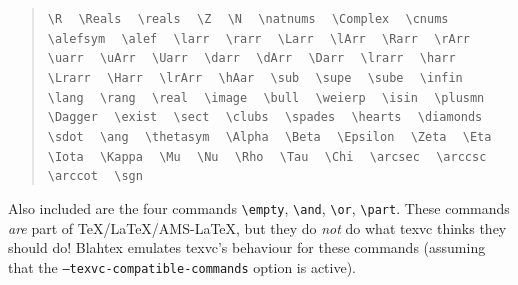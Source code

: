 \documentclass{article}
\newcommand{\texcommand}[1]{\textbackslash{}#1}
\newcommand{\spacer}{\,\,\, \hfil}
\newcommand{\lastspacer}{\hfill\hfill\hfill}
\newenvironment{mylist}{\begin{quote}}{\end{quote}}
\begin{document}
\begin{mylist}
\texttt{\texcommand{R}} \spacer
\texttt{\texcommand{Reals}} \spacer
\texttt{\texcommand{reals}} \spacer
\texttt{\texcommand{Z}} \spacer
\texttt{\texcommand{N}} \spacer
\texttt{\texcommand{natnums}} \spacer
\texttt{\texcommand{Complex}} \spacer
\texttt{\texcommand{cnums}} \spacer
\texttt{\texcommand{alefsym}} \spacer
\texttt{\texcommand{alef}} \spacer
\texttt{\texcommand{larr}} \spacer
\texttt{\texcommand{rarr}} \spacer
\texttt{\texcommand{Larr}} \spacer
\texttt{\texcommand{lArr}} \spacer
\texttt{\texcommand{Rarr}} \spacer
\texttt{\texcommand{rArr}} \spacer
\texttt{\texcommand{uarr}} \spacer
\texttt{\texcommand{uArr}} \spacer
\texttt{\texcommand{Uarr}} \spacer
\texttt{\texcommand{darr}} \spacer
\texttt{\texcommand{dArr}} \spacer
\texttt{\texcommand{Darr}} \spacer
\texttt{\texcommand{lrarr}} \spacer
\texttt{\texcommand{harr}} \spacer
\texttt{\texcommand{Lrarr}} \spacer
\texttt{\texcommand{Harr}} \spacer
\texttt{\texcommand{lrArr}} \spacer
\texttt{\texcommand{hAar}} \spacer
\texttt{\texcommand{sub}} \spacer
\texttt{\texcommand{supe}} \spacer
\texttt{\texcommand{sube}} \spacer
\texttt{\texcommand{infin}} \spacer
\texttt{\texcommand{lang}} \spacer
\texttt{\texcommand{rang}} \spacer
\texttt{\texcommand{real}} \spacer
\texttt{\texcommand{image}} \spacer
\texttt{\texcommand{bull}} \spacer
\texttt{\texcommand{weierp}} \spacer
\texttt{\texcommand{isin}} \spacer
\texttt{\texcommand{plusmn}} \spacer
\texttt{\texcommand{Dagger}} \spacer
\texttt{\texcommand{exist}} \spacer
\texttt{\texcommand{sect}} \spacer
\texttt{\texcommand{clubs}} \spacer
\texttt{\texcommand{spades}} \spacer
\texttt{\texcommand{hearts}} \spacer
\texttt{\texcommand{diamonds}} \spacer
\texttt{\texcommand{sdot}} \spacer
\texttt{\texcommand{ang}} \spacer
\texttt{\texcommand{thetasym}} \spacer
\texttt{\texcommand{Alpha}} \spacer
\texttt{\texcommand{Beta}} \spacer
\texttt{\texcommand{Epsilon}} \spacer
\texttt{\texcommand{Zeta}} \spacer
\texttt{\texcommand{Eta}} \spacer
\texttt{\texcommand{Iota}} \spacer
\texttt{\texcommand{Kappa}} \spacer
\texttt{\texcommand{Mu}} \spacer
\texttt{\texcommand{Nu}} \spacer
\texttt{\texcommand{Rho}} \spacer
\texttt{\texcommand{Tau}} \spacer
\texttt{\texcommand{Chi}} \spacer
\texttt{\texcommand{arcsec}} \spacer
\texttt{\texcommand{arccsc}} \spacer
\texttt{\texcommand{arccot}} \spacer
\texttt{\texcommand{sgn}} \lastspacer
\end{mylist}

Also included are the four commands \texttt{\texcommand{empty}},
\texttt{\texcommand{and}}, \texttt{\texcommand{or}}, \texttt{\texcommand{part}}. These commands \emph{are} part of \TeX{}/\LaTeX{}/AMS-\LaTeX{}, but they do \emph{not} do what texvc thinks they should do! Blahtex emulates texvc's behaviour for these commands (assuming that the \texttt{--texvc-compatible-commands} option is active).
\end{document}
